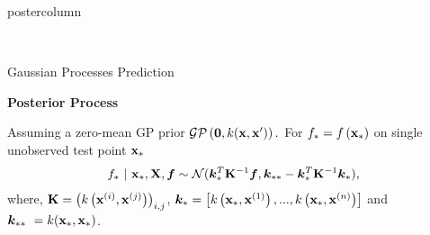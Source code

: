 \documentclass{beamer}
\begin{document}
\begin{frame}[fragile]{}
\begin{columns}
\begin{column}{.31\textwidth}
\begin{beamercolorbox}[center]{postercolumn}
\begin{minipage}{.98\textwidth}
{\begin{myblock}{}
								\begin{center}
										\\
								\end{center}
									

\end{myblock}
							\begin{myblock}{Gaussian Processes Prediction}

                \begin{codebox}
								\textbf{Posterior Process}
                \end{codebox}
								
								Assuming a zero-mean GP prior $\mathcal{GP}\left(\bm{0}, k(\xv, \xv^\prime)\right).$ 
								For $ f_* = f\left(\xv_*\right)$ on single unobserved test point $\xv_*$ 
								\begin{eqnarray*}
									f_* ~|~ \xv_*, \Xmat, \bm{f} \sim \mathcal{N}(\bm{k}_{*}^{T}\Kmat^{-1}\bm{f}, \bm{k}_{**} - \bm{k}_*^T \Kmat ^{-1}\bm{k}_*),
								\end{eqnarray*}
								where, $\Kmat = \left(k\left(\xi, \xv^{(j)}\right)\right)_{i,j}$, $\bm{k}_* = \left[k\left(\xv_*, \xi[1]\right), ..., k\left(\xv_*, \xi[n]\right)\right]$ and $ \bm{k}_{**}\ = k(\xv_*, \xv_*)$. \\
								

\end{myblock}}
\end{minipage}
\end{beamercolorbox}
\end{column}
\end{columns}
\end{frame}
\end{document}
